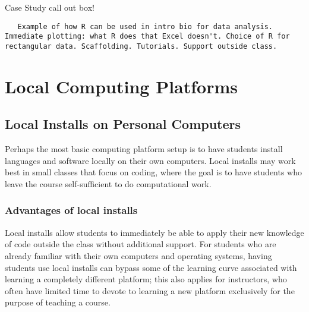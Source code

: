 
{\begin{framed}
Case Study call out box! 
\begin{snugshade*}
\begin{lstlisting}
   Example of how R can be used in intro bio for data analysis. Immediate plotting: what R does that Excel doesn't. Choice of R for rectangular data. Scaffolding. Tutorials. Support outside class.
\end{lstlisting}
\end{snugshade*}
\end{framed}}

\section{Local Computing Platforms}

\subsection{Local Installs on Personal Computers}\label{subsect:Local Installs}

Perhaps the most basic computing platform setup is to have students install languages and software locally on their own computers. 
Local installs may work best in small classes that focus on 
coding, where the goal is to have 
students who leave the course self-sufficient to do computational work.

\subsubsection{Advantages of local installs}

Local installs allow students to immediately be able to apply their new knowledge of code outside the class without additional support. For students who are already familiar with their own computers and operating systems, having students use local installs can bypass some of the learning curve associated with learning a completely different platform; this also applies for instructors, who often have limited time to devote to learning a new platform exclusively for the purpose of teaching a course.

